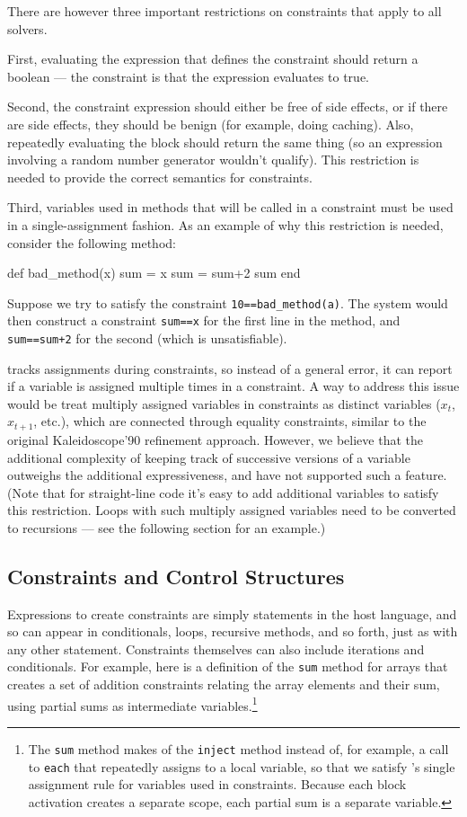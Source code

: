 There are however three important restrictions on constraints that
apply to all solvers.

First, evaluating the expression that defines the constraint should return a
boolean --- the constraint is that the expression evaluates to true.

Second, the constraint expression should either be free of side
effects, or if there are side effects, they should be benign (for
example, doing caching).  Also, repeatedly evaluating the block should
return the same thing (so an expression involving a random number
generator wouldn't qualify).  This restriction is needed to provide
the correct semantics for constraints.

Third, variables used in methods that will be called in a constraint
must be used in a single-assignment fashion.  As an example of why
this restriction is needed, consider the following method:
\begin{code}
def bad_method(x)
  sum = x
  sum = sum+2
  sum
end
\end{code}

Suppose we try to satisfy the constraint
\lstinline{10==bad_method(a)}. The system would then construct a
constraint \lstinline{sum==x} for the first line in the method, and
\lstinline{sum==sum+2} for the second (which is unsatisfiable).

\langname tracks assignments during constraints, so instead of a
general error, it can report if a variable is assigned multiple times
in a constraint.  A way to address this issue would be treat multiply
assigned variables in constraints as distinct variables (\eg $x_t$,
$x_{t+1}$, etc.), which are connected through equality constraints,
similar to the original Kaleidoscope'90 refinement approach.
However, we believe that the additional complexity of
keeping track of successive versions of a variable outweighs the
additional expressiveness, and have not supported such a feature.
(Note that for straight-line code it's easy to add additional variables
to satisfy this restriction.  Loops with such multiply assigned variables
need to be converted to recursions --- see the following section for
an example.)

\subsection{Constraints and Control Structures}

Expressions to create constraints are simply statements in the host
language, and so can appear in conditionals, loops, recursive methods,
and so forth, just as with any other statement.  Constraints
themselves can also include iterations and conditionals.  For example,
here is a definition of the \lstinline{sum} method for arrays that
creates a set of addition constraints relating the array elements and
their sum, using partial sums as intermediate variables.\footnote{The
  \lstinline{sum} method makes of the \lstinline{inject} method
  instead of, for example, a call to \lstinline{each} that repeatedly
  assigns to a local variable, so that we satisfy \langname's single
  assignment rule for variables used in constraints. Because each
  block activation creates a separate scope, each partial sum is a
  separate variable.}

